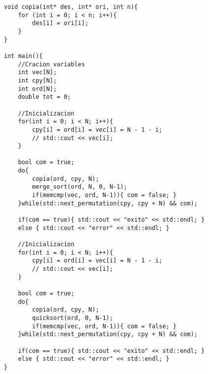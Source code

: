 \begin{lstlisting}
void copia(int* des, int* ori, int n){
    for (int i = 0; i < n; i++){
        des[i] = ori[i];
    }
}

int main(){
    //Cracion variables
    int vec[N];
    int cpy[N];
    int ord[N];
    double tot = 0;

    //Inicializacion
    for(int i = 0; i < N; i++){
        cpy[i] = ord[i] = vec[i] = N - 1 - i;
        // std::cout << vec[i];
    }

    bool com = true;
    do{
        copia(ord, cpy, N);
        merge_sort(ord, N, 0, N-1);
        if(memcmp(vec, ord, N-1)){ com = false; }
    }while(std::next_permutation(cpy, cpy + N) && com);

    if(com == true){ std::cout << "exito" << std::endl; }
    else { std::cout << "error" << std::endl; }

    //Inicializacion
    for(int i = 0; i < N; i++){
        cpy[i] = ord[i] = vec[i] = N - 1 - i;
        // std::cout << vec[i];
    }

    bool com = true;
    do{
        copia(ord, cpy, N);
        quicksort(ord, 0, N-1);
        if(memcmp(vec, ord, N-1)){ com = false; }
    }while(std::next_permutation(cpy, cpy + N) && com);

    if(com == true){ std::cout << "exito" << std::endl; }
    else { std::cout << "error" << std::endl; }
}
\end{lstlisting}